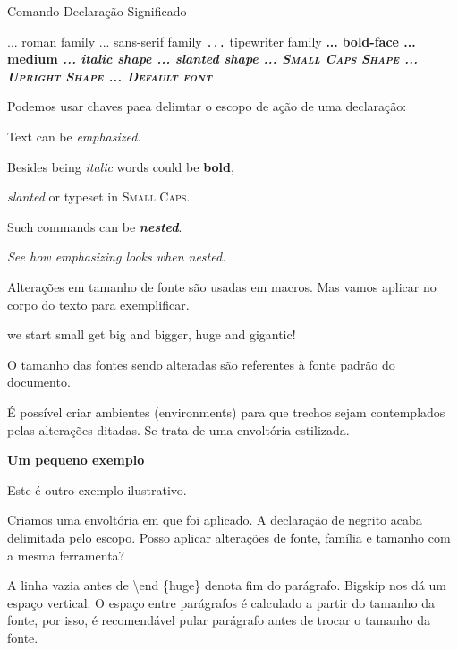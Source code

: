 \documentclass{article}
\begin{document}
Comando         Declaração  Significado

\textrm{...}    \rmfamily   roman family
\textsf{...}    \sffamily   sans-serif family
\texttt{...}    \ttfamily   tipewriter family
\textbf{...}    \bfseries   bold-face
\textmd{...}    \mdseries   medium
\textit{...}    \itshape    italic shape
\textsl{...}    \slshape    slanted shape
\textsc{...}    \scshape    Small Caps Shape
\textup{...}    \upshape    Upright Shape
\textnormal{...}    \normalfont Default font


Podemos usar chaves paea delimtar o escopo de ação
de uma declaração:

{\sffamily

Text can be {\em emphasized}.

Besides being {\itshape italic} words could be {\bfseries bold},

{\slshape slanted} or typeset in {\scshape Small Caps}.

Such commands can be {\itshape\bfseries nested}.}

{\em See how {\em emphasizing} looks when nested.}

Alterações em tamanho de fonte são usadas em macros.
Mas vamos aplicar no corpo do texto para exemplificar.

\noindent \tiny we \scriptsize start 
\footnotesize \small small
\normalsize get
\large big 
\Large and
\LARGE bigger,
\huge huge and
\Huge gigantic!

O tamanho das fontes sendo alteradas são referentes à fonte padrão do documento.

É possível criar ambientes (environments) para que trechos 
sejam contemplados pelas alterações ditadas.
Se trata de uma envoltória estilizada.

\begin{huge}
    \bfseries
    Um pequeno exemplo

\end{huge}

\bigskip

Este é outro exemplo ilustrativo.


Criamos uma envoltória em que \huge foi aplicado.
A declaração de negrito acaba delimitada pelo escopo.
Posso aplicar alterações de fonte, família e tamanho com a mesma ferramenta?

A linha vazia antes de \textbackslash end \{huge\} denota fim do parágrafo.
Bigskip nos dá um espaço vertical.
O espaço entre parágrafos é calculado a partir do tamanho 
da fonte, por isso, é recomendável pular parágrafo antes
de trocar o tamanho da fonte.
\end{document}
